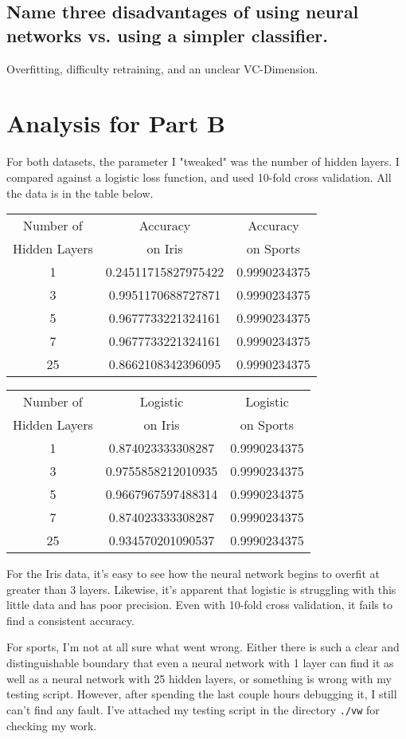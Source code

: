 \documentclass{article}
\begin{document}
\subsection{Name three disadvantages of using neural networks vs. using a simpler classifier.
}
Overfitting, difficulty retraining, and an unclear VC-Dimension. 

\section{Analysis for Part B}
For both datasets, the parameter I "tweaked" was the number of hidden layers. I compared against a logistic loss function, and used 10-fold cross validation. All the data is in the table below.

\begin{center}
\begin{tabular}{| c | c | c |}
  \hline			
  Number of & Accuracy & Accuracy \\
  Hidden Layers & on Iris & on Sports \\
  \hline
  1 & 0.24511715827975422 & 0.9990234375 \\
  3 & 0.9951170688727871 & 0.9990234375 \\
  5 & 0.9677733221324161 & 0.9990234375 \\ 
  7 & 0.9677733221324161 & 0.9990234375 \\
  25 & 0.8662108342396095 & 0.9990234375 \\ 




  \hline  
\end{tabular}

\begin{tabular}{| c | c | c |}
  \hline			
  Number of & Logistic & Logistic \\
  Hidden Layers & on Iris & on Sports \\
  \hline
  1 & 0.874023333308287 & 0.9990234375  \\
  3 & 0.9755858212010935 & 0.9990234375 \\
  5 & 0.9667967597488314 & 0.9990234375 \\
  7 & 0.874023333308287 & 0.9990234375 \\ 
  25 & 0.934570201090537 & 0.9990234375 \\
  \hline  
\end{tabular}
\end{center}

For the Iris data, it's easy to see how the neural network begins to overfit at greater than 3 layers. Likewise, it's apparent that logistic is struggling with this little data and has poor precision. Even with 10-fold cross validation, it fails to find a consistent accuracy. 

For sports, I'm not at all sure what went wrong. Either there is such a clear and distinguishable boundary that even a neural network with 1 layer can find it as well as a neural network with 25 hidden layers, or something is wrong with my testing script. However, after spending the last couple hours debugging it, I still can't find any fault. I've attached my testing script in the directory \texttt{./vw} for checking my work. 
\end{document}
